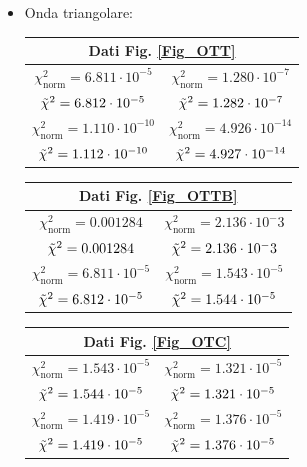 \documentclass{article}[a4paper, oneside,11pt]
\begin{document}
\begin{itemize}
            
        \item Onda triangolare:
            \begin{center}
    \begin{tabular}{|c|c|}
        \hline
        \multicolumn{2}{|c|}{Dati Fig. \ref{Fig_OTT}}\\
        \hline
        $\chi^2_{\text{norm}} = 6.811\cdot10^{-5}$ & $\chi^2_{\text{norm}} = 1.280\cdot10^{-7}$ \\
        $\Tilde{\chi}^2 = 6.812\cdot10^{-5}$ & $\Tilde{\chi}^2 = 1.282\cdot10^{-7}$\\
        \hline
        $\chi^2_{\text{norm}} = 1.110\cdot10^{-10}$ & $\chi^2_{\text{norm}} = 4.926\cdot10^{-14}$ \\
        $\Tilde{\chi}^2 = 1.112\cdot10^{-10}$ & $\Tilde{\chi}^2 = 4.927\cdot10^{-14}$\\
        \hline
    \end{tabular}
    \quad
    \begin{tabular}{|c|c|}
        \hline
        \multicolumn{2}{|c|}{Dati Fig. \ref{Fig_OTTB}}\\
        \hline
        $\chi^2_{\text{norm}} = 0.001284$ & $\chi^2_{\text{norm}} = 2.136\cdot{10^-3}$\\
        $\Tilde{\chi}^2 = 0.001284$ & $\Tilde{\chi}^2 = 2.136\cdot{10^-3}$\\
        \hline
        $\chi^2_{\text{norm}} = 6.811\cdot10^{-5}$ & $\chi^2_{\text{norm}} = 1.543\cdot10^{-5}$\\
        $\Tilde{\chi}^2 = 6.812\cdot10^{-5}$ & $\Tilde{\chi}^2 = 1.544\cdot10^{-5}$\\
        \hline
    \end{tabular}
    \quad
    \begin{tabular}{|c|c|}
        \hline
        \multicolumn{2}{|c|}{Dati Fig. \ref{Fig_OTC}}\\
        \hline
        $\chi^2_{\text{norm}} = 1.543\cdot10^{-5}$ & $\chi^2_{\text{norm}} = 1.321\cdot10^{-5}$\\
        $\Tilde{\chi}^2 = 1.544\cdot10^{-5}$ & $\Tilde{\chi}^2 = 1.321\cdot10^{-5}$\\
        \hline
        $\chi^2_{\text{norm}} = 1.419\cdot10^{-5}$ & $\chi^2_{\text{norm}} = 1.376\cdot10^{-5}$\\
        $\Tilde{\chi}^2 = 1.419\cdot10^{-5}$ & $\Tilde{\chi}^2 = 1.376\cdot10^{-5}$\\
        \hline
    \end{tabular}
            \end{center}
    \end{itemize}
        
\end{document}
